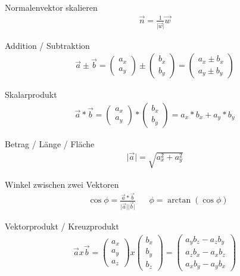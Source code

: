 \documentclass[17pt]{extarticle}
\newcommand{\norm}[1]{\lvert #1 \rvert}
\begin{document}
	Normalenvektor skalieren
	\begin{align}
		\vec{n} = \frac{1}{\norm{\vec{w}}} \vec{w}
	\end{align}

	Addition / Subtraktion
	\begin{align}	
		\vec{a} \pm \vec{b} = 
		\begin{pmatrix} a_x \\ a_y \end{pmatrix}
		\pm
		\begin{pmatrix} b_x \\ b_y \end{pmatrix}
		=
		\begin{pmatrix} a_x \pm b_x \\ a_y \pm b_y \end{pmatrix}
	\end{align}
	
	Skalarprodukt 	
	\begin{align}	
	\vec{a} * \vec{b} = 
	\begin{pmatrix} a_x \\ a_y \end{pmatrix}
	*
	\begin{pmatrix} b_x \\ b_y \end{pmatrix}
	= a_x * b_x + a_y * b_y
	\end{align}
	
	Betrag / Länge / Fläche
	\begin{align}
		\norm{\vec{a}} = \sqrt{a_x^2 + a_y^2}
	\end{align}
	
	Winkel zwischen zwei Vektoren
	\begin{align}
		&\cos \phi = \frac{\vec{a} * \vec{b}}{\norm{\vec{a}} \norm{\vec{b}}}
		&&\phi = \arctan(\cos \phi)
	\end{align}
	
	Vektorprodukt / Kreuzprodukt
	\begin{align}
		\vec{a} x \vec{b} = 
		\begin{pmatrix} a_x \\ a_y \\ a_z \end{pmatrix}
		x
		\begin{pmatrix} b_x \\ b_y \\ b_z \end{pmatrix}
		=
		\begin{pmatrix} a_y b_z - a_z b_y \\ a_z b_x - a_x b_z \\ a_x b_y - a_y b_x \end{pmatrix}
	\end{align}
	
\end{document}
